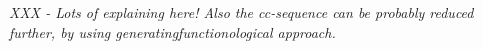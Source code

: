 \documentclass[11pt]{article} %
\begin{document}
{\em XXX - Lots of explaining here! Also the cc-sequence can be
  probably reduced further, by using generatingfunctionological approach.}




\end{document}
